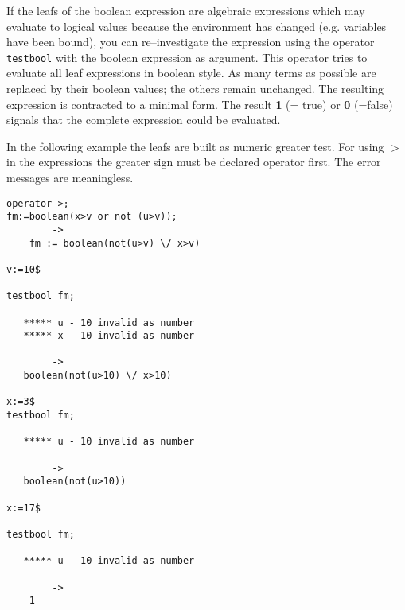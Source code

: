 \hypertarget{operator:TESTBOOL}{}
If the leafs of the boolean expression are algebraic expressions
which may evaluate to logical values because the environment
has changed (e.g. variables have been bound), you can re--investigate
the expression using the operator \texttt{testbool}
with the boolean
expression as argument. This operator tries to evaluate all
leaf expressions in \REDUCE boolean style. As many
terms as possible are replaced by their boolean values; the others
remain unchanged. The resulting expression is contracted to a
minimal form. The result \textbf{1} (= true) or \textbf{0} (=false)
signals that the complete expression could be evaluated. 

In the following example the leafs are built as numeric greater test.
For using $\mathbf{>}$ in the expressions the greater sign must
be declared operator first. The error messages are meaningless.
\begin{verbatim}
operator >;
fm:=boolean(x>v or not (u>v));
        ->
    fm := boolean(not(u>v) \/ x>v)

v:=10$

testbool fm;

   ***** u - 10 invalid as number
   ***** x - 10 invalid as number

        ->
   boolean(not(u>10) \/ x>10)

x:=3$
testbool fm;

   ***** u - 10 invalid as number

        ->
   boolean(not(u>10))

x:=17$

testbool fm;

   ***** u - 10 invalid as number
      
        ->
    1
 
\end{verbatim}


